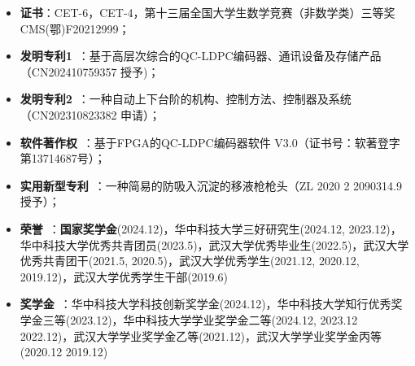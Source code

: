 \documentclass{resume} %
\begin{document}
\begin{itemize}[parsep=0.5ex]
    \item \textbf{证书}：CET-6，CET-4，第十三届全国大学生数学竞赛（非数学类）三等奖 CMS(鄂)F20212999；
    \item \textbf{发明专利1}\ ：基于高层次综合的QC-LDPC编码器、通讯设备及存储产品（CN202410759357 授予)；
    \item \textbf{发明专利2}\ ：一种自动上下台阶的机构、控制方法、控制器及系统（CN202310823382 申请）；
    \item \textbf{软件著作权}\ ：基于FPGA的QC-LDPC编码器软件 V3.0（证书号：软著登字第13714687号）；
    \item \textbf{实用新型专利}\ ：一种简易的防吸入沉淀的移液枪枪头（ZL 2020 2 2090314.9 授予）；
    \item \textbf{荣誉}\ ：\textbf{国家奖学金}(2024.12)，华中科技大学三好研究生(2024.12, 2023.12)，华中科技大学优秀共青团员(2023.5)，武汉大学优秀毕业生(2022.5)，武汉大学优秀共青团干(2021.5, 2020.5)，武汉大学优秀学生(2021.12, 2020.12, 2019.12)，武汉大学优秀学生干部(2019.6)

    \item \textbf{奖学金}\ ：华中科技大学科技创新奖学金(2024.12)，华中科技大学知行优秀奖学金三等(2023.12)，华中科技大学学业奖学金二等(2024.12, 2023.12 2022.12)，武汉大学学业奖学金乙等(2021.12)，武汉大学学业奖学金丙等(2020.12 2019.12)
\end{itemize}



\end{document}
